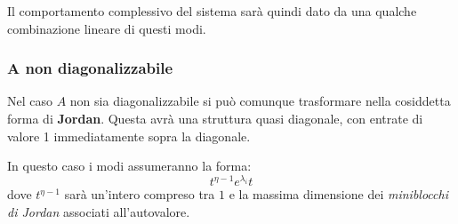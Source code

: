 \documentclass[a4paper,11pt]{article}
\begin{document}
Il comportamento complessivo del sistema sarà quindi dato da una qualche combinazione lineare di questi modi.

\subsubsection{A non diagonalizzabile}
Nel caso $A$ non sia diagonalizzabile si può comunque trasformare nella cosiddetta forma di \textbf{Jordan}.
Questa avrà una struttura quasi diagonale, con entrate di valore 1 immediatamente sopra la diagonale. 

In questo caso i modi assumeranno la forma:
$$
t^{\eta - 1}e^{\lambda_i} t
$$
dove $t^{\eta - 1}$ sarà un'intero compreso tra $1$ e la massima dimensione dei \textit{miniblocchi di Jordan} associati all'autovalore.
\end{document}
